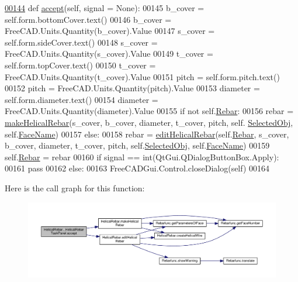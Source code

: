 \begin{DoxyCode}
\hypertarget{classHelicalRebar_1_1__HelicalRebarTaskPanel.tex_l00144}{}\hyperlink{classHelicalRebar_1_1__HelicalRebarTaskPanel_acdfb101876d4841ba277e2e884ebaf9d}{00144}     \textcolor{keyword}{def }\hyperlink{classHelicalRebar_1_1__HelicalRebarTaskPanel_acdfb101876d4841ba277e2e884ebaf9d}{accept}(self, signal = None):
00145         b\_cover = self.form.bottomCover.text()
00146         b\_cover = FreeCAD.Units.Quantity(b\_cover).Value
00147         s\_cover = self.form.sideCover.text()
00148         s\_cover = FreeCAD.Units.Quantity(s\_cover).Value
00149         t\_cover = self.form.topCover.text()
00150         t\_cover = FreeCAD.Units.Quantity(t\_cover).Value
00151         pitch = self.form.pitch.text()
00152         pitch = FreeCAD.Units.Quantity(pitch).Value
00153         diameter = self.form.diameter.text()
00154         diameter = FreeCAD.Units.Quantity(diameter).Value
00155         \textcolor{keywordflow}{if} \textcolor{keywordflow}{not} self.\hyperlink{classHelicalRebar_1_1__HelicalRebarTaskPanel_a18e1b46858c6d4ca5f6925d69ea15807}{Rebar}:
00156             rebar = \hyperlink{namespaceHelicalRebar_a8a4f12ed70819996ac31877957dfab08}{makeHelicalRebar}(s\_cover, b\_cover, diameter, t\_cover, pitch, self.
      \hyperlink{classHelicalRebar_1_1__HelicalRebarTaskPanel_a6666e765dc0ac4e8bd4d5c1825862795}{SelectedObj}, self.\hyperlink{classHelicalRebar_1_1__HelicalRebarTaskPanel_ac6f5e0df8c90110fdcb82cb9725ae6b6}{FaceName})
00157         \textcolor{keywordflow}{else}:
00158             rebar = \hyperlink{namespaceHelicalRebar_aea0d3838b1b171f801acf1046d111c8b}{editHelicalRebar}(self.\hyperlink{classHelicalRebar_1_1__HelicalRebarTaskPanel_a18e1b46858c6d4ca5f6925d69ea15807}{Rebar}, s\_cover, b\_cover, diameter, t\_cover, 
      pitch, self.\hyperlink{classHelicalRebar_1_1__HelicalRebarTaskPanel_a6666e765dc0ac4e8bd4d5c1825862795}{SelectedObj}, self.\hyperlink{classHelicalRebar_1_1__HelicalRebarTaskPanel_ac6f5e0df8c90110fdcb82cb9725ae6b6}{FaceName})
00159         self.\hyperlink{classHelicalRebar_1_1__HelicalRebarTaskPanel_a18e1b46858c6d4ca5f6925d69ea15807}{Rebar} = rebar
00160         \textcolor{keywordflow}{if} signal == int(QtGui.QDialogButtonBox.Apply):
00161             \textcolor{keywordflow}{pass}
00162         \textcolor{keywordflow}{else}:
00163             FreeCADGui.Control.closeDialog(self)
00164 
\end{DoxyCode}


Here is the call graph for this function\+:\nopagebreak
\begin{figure}[H]
\begin{center}
\leavevmode
\includegraphics[width=350pt]{classHelicalRebar_1_1__HelicalRebarTaskPanel_acdfb101876d4841ba277e2e884ebaf9d_cgraph}
\end{center}
\end{figure}




